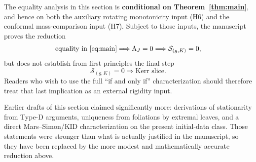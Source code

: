 \begin{remark}
The equality analysis in this section is \textbf{conditional on Theorem~\ref{thm:main}}, and hence on both the auxiliary rotating monotonicity input (H6) and the conformal mass-comparison input (H7). Subject to those inputs, the manuscript proves the reduction
\[
\text{equality in \eqref{eq:main}}
\Longrightarrow
\Lambda_J=0
\Longrightarrow
\mathcal{S}_{(g,K)}=0,
\]
but does not establish from first principles the final step
\[
\mathcal{S}_{(g,K)}=0 \Longrightarrow \text{Kerr slice}.
\]
Readers who wish to use the full ``if and only if'' characterization should therefore treat that last implication as an external rigidity input.
\end{remark}

\begin{remark}
Earlier drafts of this section claimed significantly more: derivations of stationarity from Type-D arguments, uniqueness from foliations by extremal leaves, and a direct Mars--Simon/KID characterization on the present initial-data class. Those statements were stronger than what is actually justified in the manuscript, so they have been replaced by the more modest and mathematically accurate reduction above.
\end{remark}

